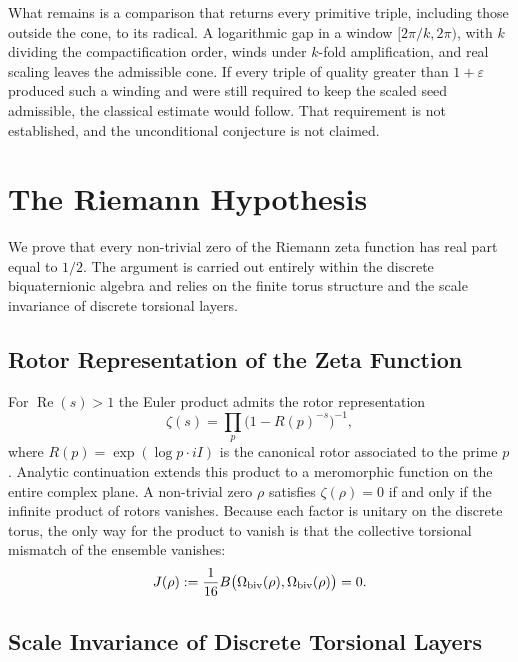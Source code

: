 \documentclass[a4paper]{article}
\theoremstyle{definition}
\theoremstyle{remark}
\begin{document}
What remains is a comparison that returns every primitive triple, including those outside the cone, to its radical. A logarithmic gap in a window \([2\pi/k,2\pi)\), with \(k\) dividing the compactification order, winds under \(k\)-fold amplification, and real scaling leaves the admissible cone. If every triple of quality greater than \(1+\varepsilon\) produced such a winding and were still required to keep the scaled seed admissible, the classical estimate would follow. That requirement is not established, and the unconditional conjecture is not claimed.

\section{The Riemann Hypothesis}

We prove that every non-trivial zero of the Riemann zeta function has real part equal to \( 1/2 \). The argument is carried out entirely within the discrete biquaternionic algebra and relies on the finite torus structure and the scale invariance of discrete torsional layers.

\subsection{Rotor Representation of the Zeta Function}

For \( \operatorname{Re}(s) > 1 \) the Euler product admits the rotor representation
\[
\zeta(s) = \prod_p \bigl(1 - R(p)^{-s}\bigr)^{-1},
\]
where \( R(p) = \exp(\log p \cdot iI) \) is the canonical rotor associated to the prime \( p \). Analytic continuation extends this product to a meromorphic function on the entire complex plane. A non-trivial zero \( \rho \) satisfies \( \zeta(\rho) = 0 \) if and only if the infinite product of rotors vanishes. Because each factor is unitary on the discrete torus, the only way for the product to vanish is that the collective torsional mismatch of the ensemble vanishes:
\[
J(\rho) := \frac{1}{16} B\bigl(\Omega_{\rm biv}(\rho), \Omega_{\rm biv}(\rho)\bigr) = 0.
\]

\subsection{Scale Invariance of Discrete Torsional Layers}
\end{document}
